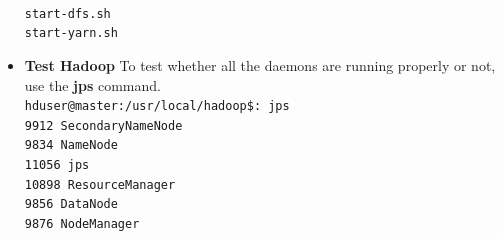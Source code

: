 \documentclass[12pt]{book}
\newcommand{\shellcmd}[1]{\\\indent\texttt{\footnotesize #1}\\}
\begin{document}
\begin{itemize}
        \shellcmd{start-dfs.sh\\\indent 
                  start-yarn.sh
                  }
 \item \textbf{Test Hadoop}
 To test whether all the daemons are running properly or not, use the \textbf{jps} command.
\shellcmd{hduser@master:/usr/local/hadoop\$: jps\\
		  9912   SecondaryNameNode \\
		  9834   NameNode\\
		  11056   jps\\
		  10898  ResourceManager\\
		  9856   DataNode\\
		  9876   NodeManager \\
}
\end{itemize}
\end{document}

